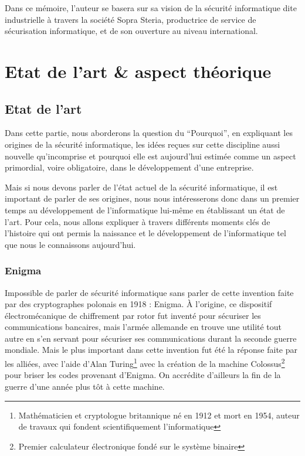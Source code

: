 \documentclass[a4paper]{memoir}
\begin{document}
Dans ce mémoire, l'auteur se basera sur sa vision de la sécurité informatique dite industrielle à travers la société Sopra Steria, productrice de service de sécurisation informatique, et de son ouverture au niveau international.




\part{Etat de l'art \& aspect théorique}


\chapter{Etat de l'art}%

Dans cette partie, nous aborderons la question du ``Pourquoi'', en expliquant les origines de la sécurité informatique, les idées reçues sur cette discipline aussi nouvelle qu'incomprise et pourquoi elle est aujourd'hui estimée comme un aspect primordial, voire obligatoire, dans le développement d'une entreprise.

\noindent Mais si nous devons parler de l'état actuel de la sécurité informatique, il est important de parler de ses origines, nous nous intéresserons donc dans un premier temps au développement de l'informatique lui-même en établissant un état de l'art. Pour cela, nous allons expliquer à travers différents moments clés de l'histoire qui ont permis la naissance et le développement de l'informatique tel que nous le connaissons aujourd'hui.\\


\section{Enigma}

Impossible de parler de sécurité informatique sans parler de cette invention faite par des cryptographes polonais en 1918 : Enigma.
À l'origine, ce dispositif électromécanique de chiffrement par rotor fut inventé pour sécuriser les communications bancaires, mais l'armée allemande en trouve une utilité tout autre en s'en servant pour sécuriser ses communications durant la seconde guerre mondiale. Mais le plus important dans cette invention fut été la réponse faite par les alliées, avec l'aide d'Alan Turing\footnote{Mathématicien et cryptologue britannique né en 1912 et mort en 1954, auteur de travaux qui fondent scientifiquement l'informatique} avec la création de la machine Colossus\footnote{Premier calculateur électronique fondé sur le système binaire} pour briser les codes provenant d'Enigma. On accrédite d'ailleurs la fin de la guerre d'une année plus tôt à cette machine.
\end{document}
